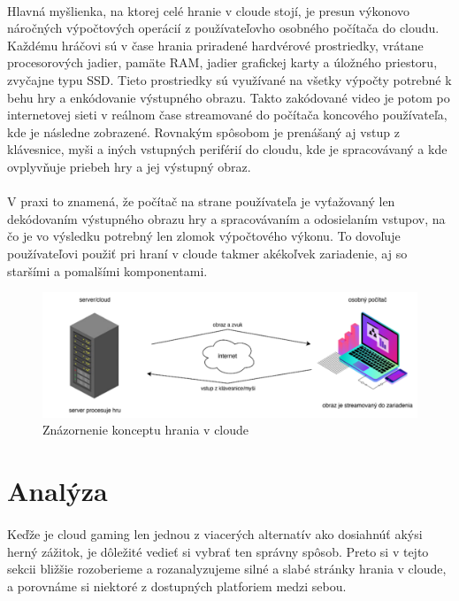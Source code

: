 \documentclass[10pt,twoside,slovak,a4paper]{article}
\begin{document}
\paragraph{} Hlavná myšlienka, na ktorej celé hranie v cloude stojí, je presun výkonovo náročných výpočtových operácií z používateľovho osobného počítača do cloudu. Každému hráčovi sú v čase hrania priradené hardvérové prostriedky, vrátane procesorových jadier, pamäte RAM, jadier grafickej karty a úložného priestoru, zvyčajne typu SSD. Tieto prostriedky sú využívané na všetky výpočty potrebné k behu hry a enkódovanie výstupného obrazu. Takto zakódované video je potom po internetovej sieti v reálnom čase streamované do počítača koncového používateľa, kde je následne zobrazené. Rovnakým spôsobom je prenášaný aj vstup z klávesnice, myši a iných vstupných periférií do cloudu, kde je spracovávaný a kde ovplyvňuje priebeh hry a jej výstupný obraz.\cite{7182690}

\paragraph{} V praxi to znamená, že počítač na strane používateľa je vyťažovaný len dekódovaním výstupného obrazu hry a spracovávaním a odosielaním vstupov, na čo je vo výsledku potrebný len zlomok výpočtového výkonu. To dovoľuje používateľovi použiť pri hraní v cloude takmer akékoľvek zariadenie, aj so staršími a pomalšími komponentami.\cite{7182690}

\begin{figure}[H]
	\includegraphics[width=1.0\textwidth]{diagram.pdf}
	\caption{Znázornenie konceptu hrania v cloude}
	\label{fig:cloud-gaming-concept}
\end{figure}



\section {Analýza}

\paragraph{} Keďže je cloud gaming len jednou z viacerých alternatív ako dosiahnúť akýsi herný zážitok, je dôležité vedieť si vybrať ten správny spôsob. Preto si v tejto sekcii bližšie rozoberieme a rozanalyzujeme silné a slabé stránky hrania v cloude, a porovnáme si niektoré z dostupných platforiem medzi sebou.
\end{document}
